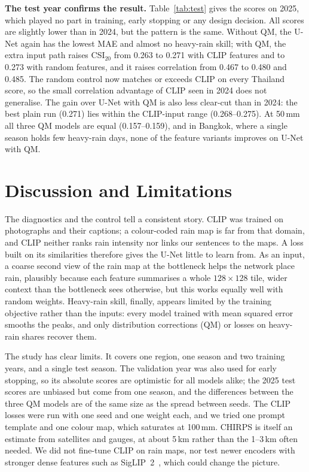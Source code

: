 \documentclass[sigconf]{acmart}
\begin{document}
\textbf{The test year confirms the result.} Table~\ref{tab:test} gives the
scores on 2025, which played no part in training, early stopping or any
design decision. All scores are slightly lower than in 2024, but the
pattern is the same. Without QM, the U-Net again has the lowest MAE and
almost no heavy-rain skill; with QM, the extra input path raises
CSI$_{20}$ from 0.263 to 0.271 with CLIP features and to 0.273 with
random features, and it raises correlation from 0.467 to 0.480 and 0.485.
The random control now matches or exceeds CLIP on every Thailand score,
so the small correlation advantage of CLIP seen in 2024 does not
generalise. The gain over U-Net with QM is also less clear-cut than in
2024: the best plain run (0.271) lies within the CLIP-input range
(0.268--0.275). At 50\,mm all three QM models are equal (0.157--0.159),
and in Bangkok, where a single season holds few heavy-rain days, none of
the feature variants improves on U-Net with QM.

\section{Discussion and Limitations}

The diagnostics and the control tell a consistent story. CLIP was trained
on photographs and their captions; a colour-coded rain map is far from that
domain, and CLIP neither ranks rain intensity nor links our sentences to
the maps. A loss built on its similarities therefore gives the U-Net
little to learn from. As an input, a coarse second view of the rain map at
the bottleneck helps the network place rain, plausibly because each
feature summarises a whole $128\times128$ tile, wider context than the
bottleneck sees otherwise, but this works equally well with random
weights. Heavy-rain skill, finally, appears limited by the training
objective rather than the inputs: every model trained with mean squared
error smooths the peaks, and only distribution corrections (QM) or losses
on heavy-rain shares recover them.

The study has clear limits. It covers one region, one season and two
training years, and a single test season. The validation year was also
used for early stopping, so its absolute scores are optimistic for all
models alike; the 2025 test scores are unbiased but come from one season,
and the differences between the three QM models are of the same size as
the spread between seeds. The CLIP losses were run
with one seed and one weight each, and we tried one prompt template and one
colour map, which saturates at 100\,mm. CHIRPS is itself an estimate from
satellites and gauges, at about 5\,km rather than the 1--3\,km often
needed. We did not fine-tune CLIP on rain maps, nor test newer encoders
with stronger dense features such as SigLIP~2~\cite{tschannen2025siglip2},
which could change the picture.
\end{document}
